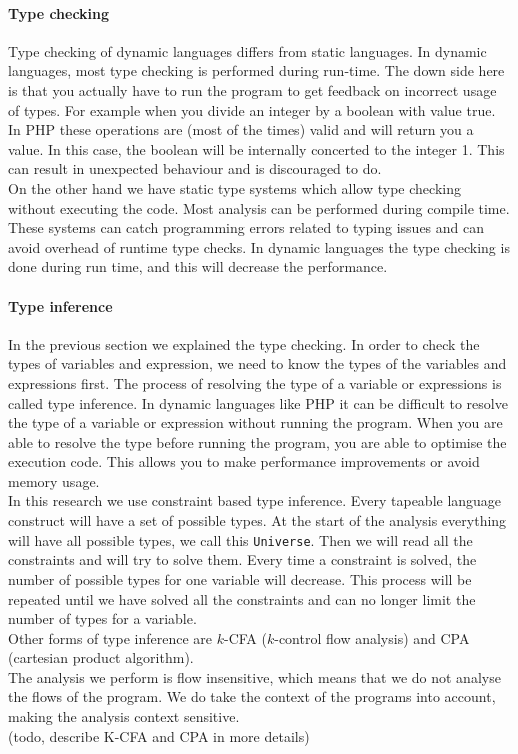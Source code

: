 \documentclass[../main.tex]{subfiles}
\begin{document}
    \paragraph{Type checking}
    Type checking of dynamic languages differs from static languages.
    In dynamic languages, most type checking is performed during run-time.
    The down side here is that you actually have to run the program to get feedback on incorrect usage of types. 
    For example when you divide an integer by a boolean with value true.
    In PHP these operations are (most of the times) valid and will return you a value.
    In this case, the boolean will be internally concerted to the integer 1.
    This can result in unexpected behaviour and is discouraged to do.
    \\
    On the other hand we have static type systems which allow type checking without executing the code.
    Most analysis can be performed during compile time.
    These systems can catch programming errors related to typing issues and can avoid overhead of runtime type checks.
    In dynamic languages the type checking is done during run time, and this will decrease the performance.
    
    \paragraph{Type inference}
    In the previous section we explained the type checking.
    In order to check the types of variables and expression, we need to know the types of the variables and expressions first.
    The process of resolving the type of a variable or expressions is called type inference.
    In dynamic languages like PHP it can be difficult to resolve the type of a variable or expression without running the program.
    When you are able to resolve the type before running the program, you are able to optimise the execution code.
    This allows you to make performance improvements or avoid memory usage.
    \\
    In this research we use constraint based type inference.
    Every tapeable language construct will have a set of possible types.
    At the start of the analysis everything will have all possible types, we call this \texttt{Universe}.
    Then we will read all the constraints and will try to solve them.
    Every time a constraint is solved, the number of possible types for one variable will decrease.
    This process will be repeated until we have solved all the constraints and can no longer limit the number of types for a variable. 
    \\
    Other forms of type inference are $k$-CFA ($k$-control flow analysis) and CPA (cartesian product algorithm).
    \\
    The analysis we perform is flow insensitive, which means that we do not analyse the flows of the program.
    We do take the context of the programs into account, making the analysis context sensitive.
    \\
    (todo, describe K-CFA and CPA in more details)
    
\end{document}
